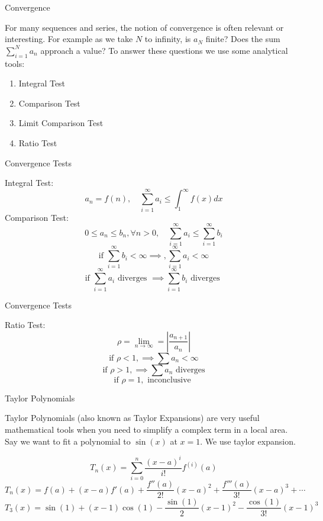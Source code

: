 \documentclass{beamer}
\begin{document}
\begin{frame}{Convergence}

For many sequences and series, the notion of convergence is often relevant or interesting. For example as we take $N$ to infinity, is $a_N$ finite? Does the sum $\sum_{i=1}^N a_n$ approach a value? To answer these questions we use some analytical tools:
\begin{enumerate}
    \item Integral Test
    \item Comparison Test
    \item Limit Comparison Test
    \item Ratio Test
\end{enumerate}
\end{frame}

\begin{frame}{Convergence Tests}

Integral Test:
\[
    a_n = f(n), \quad \sum_{i=1}^{\infty} a_i \le \int_1^{\infty} f(x)dx
\]
Comparison Test:
\[
    0 \le a_n \le b_n, \forall n > 0, \quad \sum_{i=1}^{\infty} a_i \le \sum_{i=1}^{\infty} b_i
\]
\[
    \text{if } \sum_{i=1}^{\infty} b_i < \infty \implies, \sum_{i=1}^{\infty} a_i < \infty
\]
\[
    \text{if } \sum_{i=1}^{\infty} a_i \text{ diverges } \implies \sum_{i=1}^{\infty} b_i \text{ diverges }
\]

\end{frame}

\begin{frame}{Convergence Tests}

Ratio Test:
\[
    \rho = \lim_{n \to \infty} = \left| \frac{a_{n+1}}{a_n}\right|
\]
\[
    \text{if } \rho < 1, \implies \sum a_n < \infty
\]
\[
    \text{if } \rho > 1, \implies \sum a_n  \text{ diverges}
\]
\[
    \text{if } \rho = 1, \text{ inconclusive }
\]

\end{frame}

\begin{frame}{Taylor Polynomials}

Taylor Polynomials (also known as Taylor Expansions) are very useful mathematical tools when you need to simplify a complex term in a local area. Say we want to fit a polynomial to $\sin(x)$ at $x = 1$. We use taylor expansion. 

\[
    T_n(x) = \sum_{i=0}^n \frac{(x - a)^i}{i!} f^{(i)}(a)
\]
\[
    T_n(x) = f(a) + (x - a)f'(a) + \frac{f''(a)}{2!}(x - a)^2 + \frac{f'''(a)}{3!}(x - a)^3 + \cdots
\]
\[
    T_3(x) = \sin(1) + (x - 1)\cos(1) - \frac{\sin(1)}{2}(x - 1)^2 - \frac{\cos(1)}{3!}(x - 1)^3
\]
\end{frame}
\end{document}
